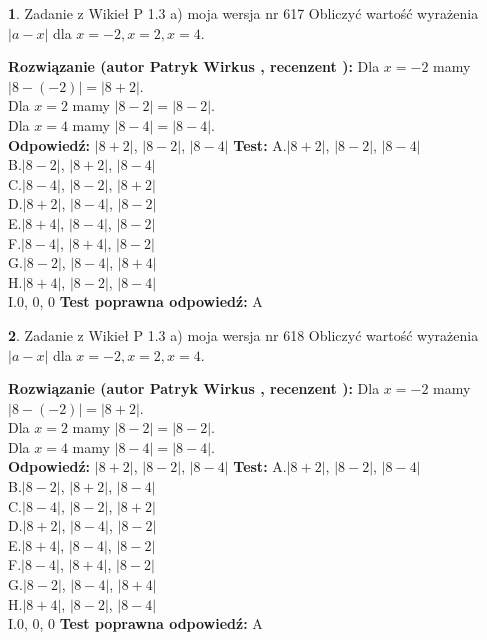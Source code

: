 \documentclass[12pt, a4paper]{article}
\theoremstyle{definition} %
\newtheorem{zad}{}
\newcommand{\zadStart}[1]{\begin{zad}#1\newline}
\newcommand{\zadStop}{\end{zad}}
\newcommand{\rozwStart}[2]{\noindent \textbf{Rozwiązanie (autor #1 , recenzent #2): }\newline}
\newcommand{\rozwStop}{\newline}
\newcommand{\odpStart}{\noindent \textbf{Odpowiedź:}\newline}
\newcommand{\odpStop}{\newline}
\newcommand{\testStart}{\noindent \textbf{Test:}\newline}
\newcommand{\testStop}{\newline}
\newcommand{\kluczStart}{\noindent \textbf{Test poprawna odpowiedź:}\newline}
\newcommand{\kluczStop}{\newline}
\begin{document}
\zadStart{Zadanie z Wikieł P 1.3 a) moja wersja nr 617}
Obliczyć wartość wyrażenia $|a - x|$ dla $x=-2,x=2,x=4$.
\zadStop
\rozwStart{Patryk Wirkus}{}
Dla $x = -2$ mamy $|8 - (-2)| = |8 + 2|$.\\
Dla $x = 2$ mamy $|8 - 2| = |8 - 2|$.\\
Dla $x = 4$ mamy $|8 - 4| = |8 - 4|$.\\
\rozwStop
\odpStart
$|8 + 2|$, $|8 - 2|$, $|8 - 4|$
\odpStop
\testStart
A.$|8 + 2|$, $|8 - 2|$, $|8 - 4|$\\
B.$|8 - 2|$, $|8 + 2|$, $|8 - 4|$\\
C.$|8 - 4|$, $|8 - 2|$, $|8 + 2|$\\
D.$|8 + 2|$, $|8 - 4|$, $|8 - 2|$\\
E.$|8 + 4|$, $|8 - 4|$, $|8 - 2|$\\
F.$|8 - 4|$, $|8 + 4|$, $|8 - 2|$\\
G.$|8 - 2|$, $|8 - 4|$, $|8 + 4|$\\
H.$|8 + 4|$, $|8 - 2|$, $|8 - 4|$\\
I.$0$, $0$, $0$
\testStop
\kluczStart
A
\kluczStop



\zadStart{Zadanie z Wikieł P 1.3 a) moja wersja nr 618}
Obliczyć wartość wyrażenia $|a - x|$ dla $x=-2,x=2,x=4$.
\zadStop
\rozwStart{Patryk Wirkus}{}
Dla $x = -2$ mamy $|8 - (-2)| = |8 + 2|$.\\
Dla $x = 2$ mamy $|8 - 2| = |8 - 2|$.\\
Dla $x = 4$ mamy $|8 - 4| = |8 - 4|$.\\
\rozwStop
\odpStart
$|8 + 2|$, $|8 - 2|$, $|8 - 4|$
\odpStop
\testStart
A.$|8 + 2|$, $|8 - 2|$, $|8 - 4|$\\
B.$|8 - 2|$, $|8 + 2|$, $|8 - 4|$\\
C.$|8 - 4|$, $|8 - 2|$, $|8 + 2|$\\
D.$|8 + 2|$, $|8 - 4|$, $|8 - 2|$\\
E.$|8 + 4|$, $|8 - 4|$, $|8 - 2|$\\
F.$|8 - 4|$, $|8 + 4|$, $|8 - 2|$\\
G.$|8 - 2|$, $|8 - 4|$, $|8 + 4|$\\
H.$|8 + 4|$, $|8 - 2|$, $|8 - 4|$\\
I.$0$, $0$, $0$
\testStop
\kluczStart
A
\kluczStop
\end{document}
